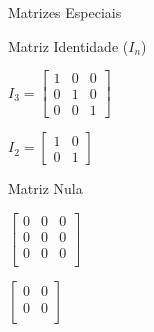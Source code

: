 \documentclass[aspectratio=169,xcolor=dvipsnames]{beamer}
\begin{document}
\begin{frame}{Matrizes Especiais}
  \begin{multicols}{2}
    \centering Matriz Identidade ($I_n$)
    \vspace{.3cm}

    $I_3 = \begin{bmatrix}
      1 & 0 & 0 \\
      0 & 1 & 0 \\
      0 & 0 & 1
    \end{bmatrix}$
    \vspace{.3cm}

    $I_2 = \begin{bmatrix}
      1 & 0 \\
      0 & 1
    \end{bmatrix}$

  \centering Matriz Nula
    \vspace{.3cm}

    $\begin{bmatrix}
      0 & 0 & 0 \\
      0 & 0 & 0 \\
      0 & 0 & 0 \\
    \end{bmatrix}$
    \vspace{.3cm}

    $\begin{bmatrix}
      0 & 0 \\
      0 & 0 \\
    \end{bmatrix}$
    
  \end{multicols}
  
\end{frame}

\end{document}
